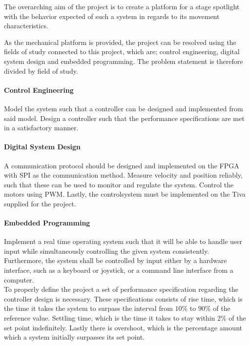 \documentclass[../../main]{subfiles}
\begin{document}
The overarching aim of the project is to create a platform for a stage spotlight with the behavior expected of such a system in regards to its movement characteristics.

As the mechanical platform is provided, the project can be resolved using the fields of study connected to this project, which are; control engineering, digital system design and embedded programming.
The problem statement is therefore divided by field of study.


\paragraph{Control Engineering}%
\label{par:control_engineering}
Model the system such that a controller can be designed and implemented from said model.
Design a controller such that the performance specifications are met in a satisfactory manner.


\paragraph{Digital System Design}%
\label{par:digital_system_design}
A communication protocol should be designed and implemented on the FPGA with SPI as the communication method.
Measure velocity and position reliably, such that these can be used to monitor and regulate the
system.
Control the motors using PWM. Lastly, the controlsystem must be implemented on the Tiva supplied for the project.

\paragraph{Embedded Programming}%
\label{par:emebedded_programming}
Implement a real time operating system such that it will be able to handle user input while simultaneously controlling the given system consistently. Furthermore, the system shall be controlled by input either by a hardware interface, such as a keyboard or joystick, or a command line interface from a computer.
\\

To properly define the project a set of performance specification regarding the controller design is necessary.
These specifications consists of rise time, which is the time it takes the system to surpass the interval from $10\%$ to $90\%$ of the reference value.
Settling time, which is the time it takes to stay within 2\% of the set point indefinitely.
Lastly there is overshoot, which is the percentage amount which a system initially surpasses its set point.\\
\end{document}
